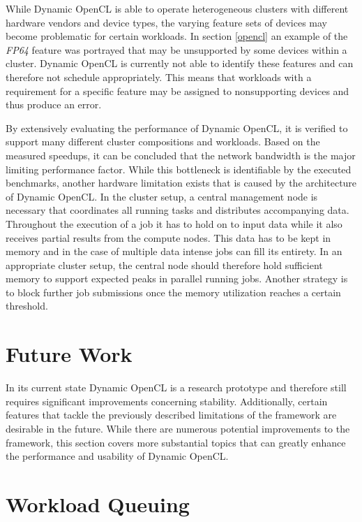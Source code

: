 While Dynamic OpenCL is able to operate heterogeneous clusters with different hardware vendors and device types, the varying feature sets of devices may become problematic for certain workloads. In section \ref{opencl} an example of the \textit{FP64} feature was portrayed that may be unsupported by some devices within a cluster. Dynamic OpenCL is currently not able to identify these features and can therefore not schedule appropriately. This means that workloads with a requirement for a specific feature may be assigned to nonsupporting devices and thus produce an error.

By extensively evaluating the performance of Dynamic OpenCL, it is verified to support many different cluster compositions and workloads. Based on the measured speedups, it can be concluded that the network bandwidth is the major limiting performance factor. While this bottleneck is identifiable by the executed benchmarks, another hardware limitation exists that is caused by the architecture of Dynamic OpenCL. In the cluster setup, a central management node is necessary that coordinates all running tasks and distributes accompanying data. Throughout the execution of a job it has to hold on to input data while it also receives partial results from the compute nodes. This data has to be kept in memory and in the case of multiple data intense jobs can fill its entirety. In an appropriate cluster setup, the central node should therefore hold sufficient memory to support expected peaks in parallel running jobs. Another strategy is to block further job submissions once the memory utilization reaches a certain threshold.

\section{Future Work}
\label{future_work}
In its current state Dynamic OpenCL is a research prototype and therefore still requires significant improvements concerning stability. Additionally, certain features that tackle the previously described limitations of the framework are desirable in the future. While there are numerous potential improvements to the framework, this section covers more substantial topics that can greatly enhance the performance and usability of Dynamic OpenCL.

\section*{Workload Queuing}

